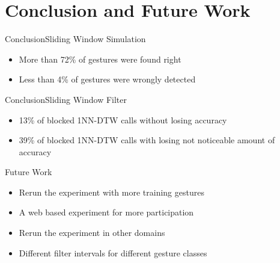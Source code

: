 \section{Conclusion and Future Work}

\begin{frame}{Conclusion}{Sliding Window Simulation}
    \begin{itemize}
        \item More than 72\% of gestures were found right
        \pause
        \item Less than 4\% of gestures were wrongly detected
    \end{itemize}
\end{frame}

\begin{frame}{Conclusion}{Sliding Window Filter}
    \begin{itemize}
        \item 13\% of blocked 1NN-DTW calls without losing accuracy
        \pause
        \item 39\% of blocked 1NN-DTW calls with losing not noticeable amount of accuracy
    \end{itemize}
\end{frame}

\begin{frame}{Future Work}
    \begin{itemize}
        \item Rerun the experiment with more training gestures
        \pause
        \item A web based experiment for more participation
        \pause
        \item Rerun the experiment in other domains
        \pause
        \item Different filter intervals for different gesture classes
    \end{itemize}
\end{frame}

